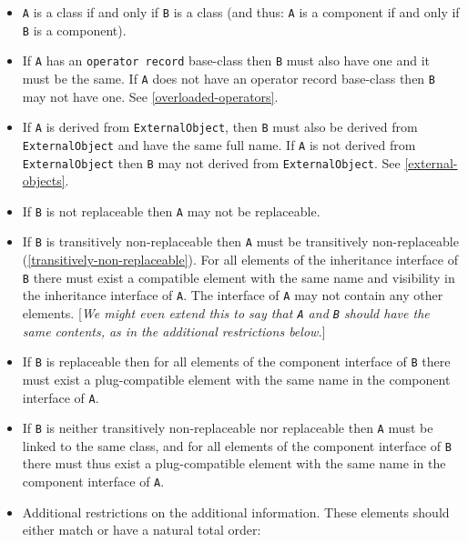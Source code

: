\begin{itemize}
\item
  \lstinline!A! is a class if and only if \lstinline!B! is a class (and thus: \lstinline!A! is a component
  if and only if \lstinline!B! is a component).
\item
  If \lstinline!A! has an \lstinline!operator record! base-class then \lstinline!B! must also have one and
  it must be the same. If \lstinline!A! does not have an operator record base-class
  then \lstinline!B! may not have one. See \autoref{overloaded-operators}.
\item
  If \lstinline!A! is derived from \lstinline!ExternalObject!, then \lstinline!B! must also be derived from
  \lstinline!ExternalObject! and have the same full name. If \lstinline!A! is not derived from
  \lstinline!ExternalObject! then \lstinline!B! may not derived from \lstinline!ExternalObject!. See
  \autoref{external-objects}.
\item
  If \lstinline!B! is not replaceable then \lstinline!A! may not be replaceable.
\item
  If \lstinline!B! is transitively non-replaceable then \lstinline!A! must be transitively
  non-replaceable (\autoref{transitively-non-replaceable}). For all elements of the inheritance
  interface of \lstinline!B! there must exist a compatible element with the same
  name and visibility in the inheritance interface of \lstinline!A!. The interface
  of \lstinline!A! may not contain any other elements. {[}\emph{We might even extend
  this to say that \lstinline!A! and \lstinline!B! should have the same contents, as in the
  additional restrictions below.}{]}
\item
  If \lstinline!B! is replaceable then for all elements of the component interface
  of \lstinline!B! there must exist a plug-compatible element with the same name in
  the component interface of \lstinline!A!.
\item
  If \lstinline!B! is neither transitively non-replaceable nor replaceable then \lstinline!A!
  must be linked to the same class, and for all elements of the
  component interface of \lstinline!B! there must thus exist a plug-compatible
  element with the same name in the component interface of \lstinline!A!.
\item
  Additional restrictions on the additional information. These elements
  should either match or have a natural total order:


\end{itemize}
